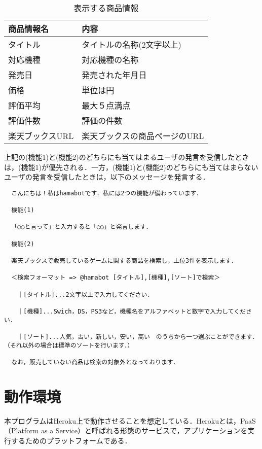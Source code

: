 \documentclass[12pt]{jsarticle}
\begin{document}
\begin{description}
  \begin{table}[tb]
    \begin{center}
      \caption{表示する商品情報}\label{tab:商品情報}
      \begin{tabular}{l|l}
        \hline\hline
        商品情報名 & 内容\\
        \hline
        タイトル & タイトルの名称(2文字以上)\\
        対応機種 & 対応機種の名称\\
        発売日 & 発売された年月日\\
        価格 & 単位は円\\
        評価平均 & 最大５点満点\\
        評価件数 & 評価の件数\\
        楽天ブックスURL & 楽天ブックスの商品ページのURL\\
        \hline
      \end{tabular}
    \end{center}
  \end{table}

\end{description}

上記の(機能1)と(機能2)のどちらにも当てはまるユーザの発言を受信したときは，(機能1)が優先される．一方，(機能1)と(機能2)のどちらにも当てはまらないユーザの発言を受信したときは，以下のメッセージを発言する．
\newpage
{
\fontsize{7pt}{8pt}\selectfont
\begin{verbatim}
  こんにちは！私はhamabotです．私には2つの機能が備わっています．

  機能(1)

  「○○と言って」と入力すると「○○」と発言します．

  機能(2)

  楽天ブックスで販売しているゲームに関する商品を検索し，上位3件を表示します．

  ＜検索フォーマット => @hamabot [タイトル],[機種],[ソート]で検索＞

  　｜[タイトル]...2文字以上で入力してください．

  　｜[機種]...Swich，DS，PS3など，機種名をアルファベットと数字で入力してください．

  　｜[ソート]...人気，古い，新しい，安い，高い　のうちから一つ選ぶことができます．（それ以外の場合は標準のソートを行います．）

  なお，販売していない商品は検索の対象外となっております．
\end{verbatim}
}

\section{動作環境}\label{動作環境}
本プログラムはHeroku\cite{heroku}上で動作させることを想定している．Herokuとは，PaaS（Platform as a Service）と呼ばれる形態のサービスで，アプリケーションを実行するためのプラットフォームである．
\end{document}
